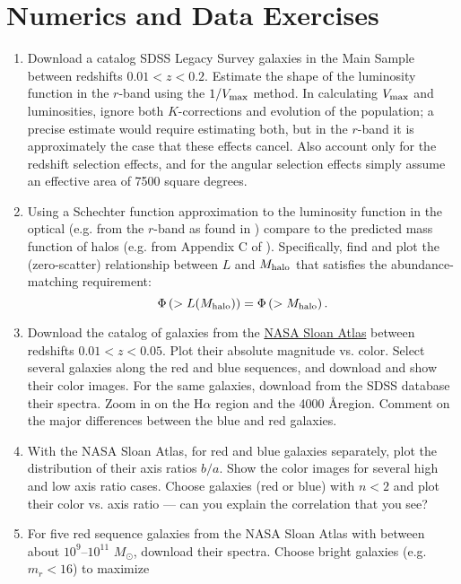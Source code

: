\section{Numerics and Data Exercises}

\begin{enumerate}
\item Download a catalog SDSS Legacy Survey galaxies in the Main
Sample between redshifts $0.01 < z < 0.2$. Estimate the shape of the
luminosity function in the $r$-band using the $1/V_{\rm max}$
method. In calculating $V_{\rm max}$ and luminosities, ignore both
$K$-corrections and evolution of the population; a precise estimate
would require estimating both, but in the $r$-band it is approximately
the case that these effects cancel. Also account only for the redshift
selection effects, and for the angular selection effects simply assume
an effective area of 7500 square degrees.
\item Using a Schechter function approximation to the luminosity
function in the optical (e.g. from the $r$-band as found
in \citet{blanton04b}) compare to the predicted mass function of halos
(e.g. from Appendix C of \citealt{tinker08a}). Specifically, find and
plot the (zero-scatter) relationship between $L$ and $M_{\rm halo}$
that satisfies the abundance-matching requirement:
\begin{equation}
\Phi\left(>L(M_{\rm halo})\right) = \Phi\left(>M_{\rm halo}\right).
\end{equation}
\item Download the catalog of galaxies from
the \href{http://nsatlas.org}{NASA Sloan Atlas} between redshifts
$0.01 < z <0.05$. Plot their absolute magnitude vs. color. Select
several galaxies along the red and blue sequences, and download and
show their color images. For the same galaxies, download from the SDSS
database their spectra. Zoom in on the H$\alpha$ region and the
4000 \AA region. Comment on the major differences between the blue and
red galaxies.
\item With the NASA Sloan Atlas, for red and blue galaxies separately, plot the
distribution of their axis ratios $b/a$. Show the color images for
several high and low axis ratio cases. Choose galaxies (red or blue)
with $n<2$ and plot their color vs. axis ratio --- can you explain the
correlation that you see?
\item For five red sequence galaxies from the NASA Sloan Atlas with
between about $10^9$--$10^{11}$ $M_\odot$, download their
spectra. Choose bright galaxies (e.g. $m_r < 16$) to maximize

\end{enumerate}
